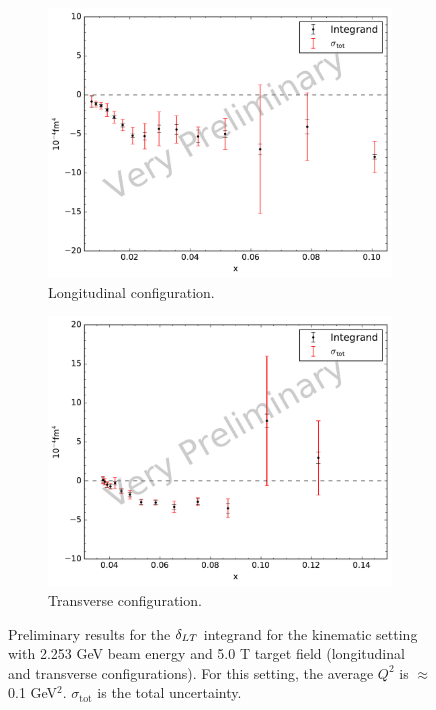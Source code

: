\begin{figure}[p!]
  \centering
  \begin{subfigure}[t]{0.79\textwidth}
    \includegraphics[width=\textwidth]{figs/dlt-model-22535000.pdf}
    \caption{Longitudinal configuration. \label{C8S5F2a}}
  \end{subfigure}
  \begin{subfigure}[t]{0.79\textwidth}
    \includegraphics[width=\textwidth]{figs/dlt-model-22535090.pdf}
    \caption{Transverse configuration. \label{C8S5F2b}}
  \end{subfigure}
  \caption[$\dlt$ integrand with $E=2.253$ GeV and $B=5.0$ T.]{Preliminary results for the $\dlt$ integrand for the kinematic setting with 2.253 GeV beam energy and 5.0 T target field (longitudinal and transverse configurations). For this setting, the average $Q^2$ is $\approx$0.1 GeV${}^2$. $\sigma_{\mathrm{tot}}$ is the total uncertainty. \label{C8S5F2}}
\end{figure}

